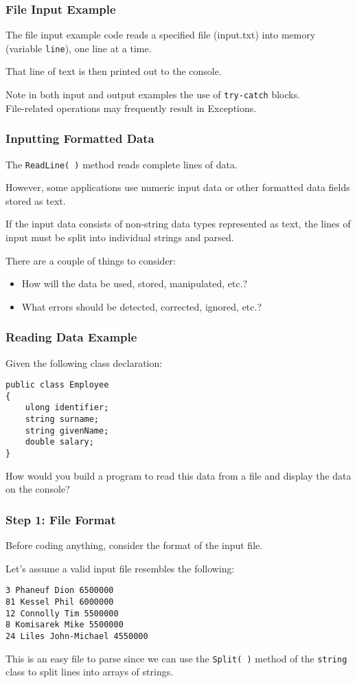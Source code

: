 \begin{frame}
\frametitle{File Input Example}
The file input example code reads a specified file (input.txt) into memory (variable \texttt{line}), one line at a time.

That line of text is then printed out to the console.

Note in both input and output examples the use of \texttt{try-catch} blocks.\\
\quad File-related operations may frequently result in Exceptions.



\end{frame}


\begin{frame}
\frametitle{Inputting Formatted Data}
The \texttt{ReadLine( )} method reads complete lines of data.

However, some applications use numeric input data or other formatted data fields stored as text.

If the input data consists of non-string data types represented as text, the lines of input must be split into individual strings and parsed.

There are a couple of things to consider:
\begin{itemize}
    \item How will the data be used, stored, manipulated, etc.?
    \item What errors should be detected, corrected, ignored, etc.?
\end{itemize}

\end{frame}


\begin{frame}[fragile]
\frametitle{Reading Data Example}

Given the following class declaration:

\begin{verbatim}
public class Employee
{
    ulong identifier;
    string surname;
    string givenName;
    double salary;
}
\end{verbatim}

How would you build a program to read this data from a file and display the data on the console?

\end{frame}

\begin{frame}[fragile]
\frametitle{Step 1: File Format}
Before coding anything, consider the format of the input file.

Let's assume a valid input file resembles the following:

\begin{verbatim}
3 Phaneuf Dion 6500000
81 Kessel Phil 6000000
12 Connolly Tim 5500000
8 Komisarek Mike 5500000
24 Liles John-Michael 4550000
\end{verbatim}

This is an easy file to parse since we can use the \texttt{Split( )} method of the \texttt{string} class to split lines into arrays of strings.


\end{frame}

